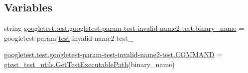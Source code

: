 \subsection*{Variables}
\begin{DoxyCompactItemize}
\item 
string \mbox{\hyperlink{namespacegoogletest_1_1test_1_1googletest-param-test-invalid-name2-test_a6aa273d4cc203f6cfc58d59bcfc9e8fe}{googletest.\+test.\+googletest-\/param-\/test-\/invalid-\/name2-\/test.\+binary\+\_\+name}} = \textquotesingle{}googletest-\/param-\/\mbox{\hyperlink{_mutual_8h_a707ee03719e99670bf6cfdfd897b8456}{test}}-\/invalid-\/name2-\/test\+\_\+\textquotesingle{}
\item 
\mbox{\hyperlink{namespacegoogletest_1_1test_1_1googletest-param-test-invalid-name2-test_ab2f615cfc990c800a7be1b423698d0ea}{googletest.\+test.\+googletest-\/param-\/test-\/invalid-\/name2-\/test.\+C\+O\+M\+M\+A\+ND}} = \mbox{\hyperlink{namespacegtest__test__utils_a89ed3717984a80ffbb7a9c92f71b86a2}{gtest\+\_\+test\+\_\+utils.\+Get\+Test\+Executable\+Path}}(binary\+\_\+name)
\end{DoxyCompactItemize}
